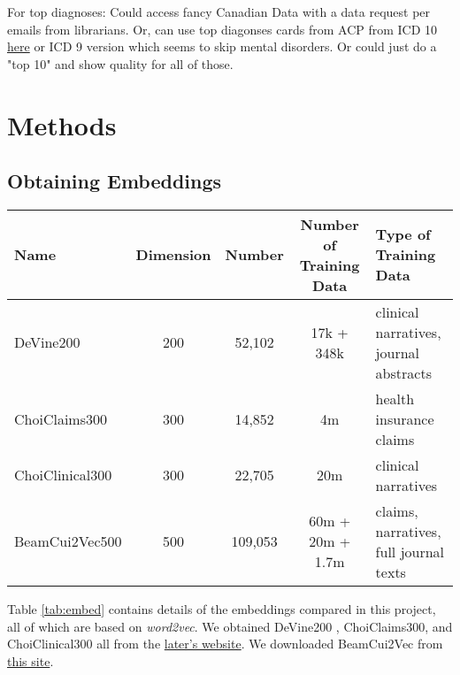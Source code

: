 \documentclass[10pt]{article}
\begin{document}
For top diagnoses: Could access fancy Canadian Data with a data request per emails from librarians. Or, can use top diagonses cards from ACP from ICD 10 \href{https://www.acponline.org/system/files/documents/running_practice/payment_coding/coding/icd10_coding_card.pdf}{here} or ICD 9 version which seems to skip mental disorders. Or could just do a "top 10" and show quality for all of those.


\section{Methods}

\subsection{Obtaining Embeddings}

\begin{table*}[h!]
	\begin{center}
		\caption{Charectoristics of the embeddings compared, including the name referred, the embedding dimensions, the number of embeddings in the dataset, and the type of data used to train them.}
		\label{tab:embed}
		\begin{tabular}{l|c|c|c|l} %
			\textbf{Name} & \textbf{Dimension} & \textbf{Number} & \textbf{Number of Training Data}& \textbf{Type of Training Data} \\
			\hline
			DeVine200 & 200 & 52,102 & 17k + 348k &clinical narratives, journal abstracts\\
			ChoiClaims300 & 300 & 14,852& 4m&health insurance claims\\
			ChoiClinical300 & 300 & 22,705&20m& clinical narratives\\
			BeamCui2Vec500 & 500 & 109,053&60m + 20m + 1.7m& claims, narratives, full journal texts\\
		\end{tabular}
	\end{center}
\end{table*}

Table \ref{tab:embed} contains details of the embeddings compared in this project, all of which are based on \emph{word2vec}. We obtained DeVine200 \cite{devineMedicalSemanticSimilarity2014}, ChoiClaims300, and ChoiClinical300 \cite{choiLearningLowDimensionalRepresentations2016} all from the \href{https://github.com/clinicalml/embeddings}{later's website}. We downloaded BeamCui2Vec \cite{beamClinicalConceptEmbeddings2018} from \href{https://figshare.com/s/00d69861786cd0156d81}{this site}. 
\end{document}
